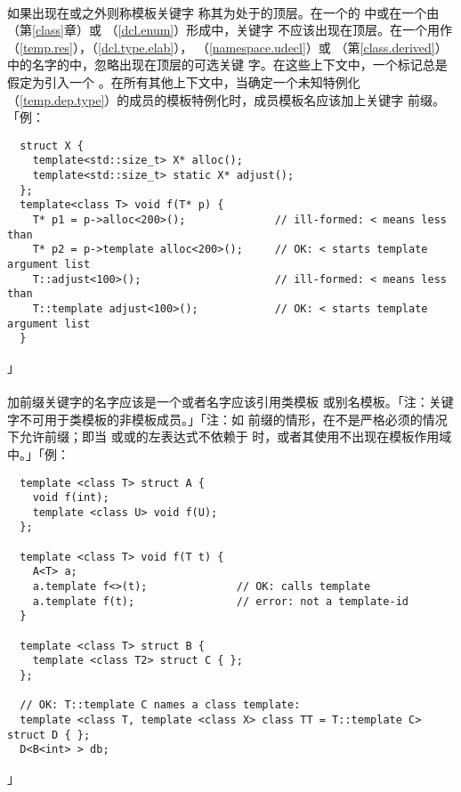 \paragraph{}
如果出现在或之外则称模板关键字
称其为处于的顶层。在一个的
中或在一个由（第\ref{class}章）或
（\ref{dcl.enum}）形成中，关键字
不应该出现在顶层。在一个用作
（\ref{temp.res}），（\ref{dcl.type.elab}），
（\ref{namespace.udecl}）或
（第\ref{class.derived}）中的名字的中，忽略出现在顶层的可选关键
字。在这些上下文中，一个\tm{<}标记总是假定为引入一个
。在所有其他上下文中，当确定一个未知特例化
（\ref{temp.dep.type}）的成员的模板特例化时，成员模板名应该加上关键字
前缀。「例：
\begin{lstlisting}
  struct X {
    template<std::size_t> X* alloc();
    template<std::size_t> static X* adjust();
  };
  template<class T> void f(T* p) {
    T* p1 = p->alloc<200>();              // ill-formed: < means less than
    T* p2 = p->template alloc<200>();     // OK: < starts template argument list
    T::adjust<100>();                     // ill-formed: < means less than
    T::template adjust<100>();            // OK: < starts template argument list
  }
\end{lstlisting}」

\paragraph{}
加前缀关键字的名字应该是一个或者名字应该引用类模板
或别名模板。「注：关键字不可用于类模板的非模板成员。」「注：如
前缀的情形，在不是严格必须的情况下允许前缀；即当
或\tm{->}或的左表达式不依赖于
时，或者其使用不出现在模板作用域中。」「例：
\begin{lstlisting}
  template <class T> struct A {
    void f(int);
    template <class U> void f(U);
  };

  template <class T> void f(T t) {
    A<T> a;
    a.template f<>(t);              // OK: calls template
    a.template f(t);                // error: not a template-id
  }

  template <class T> struct B {
    template <class T2> struct C { };
  };

  // OK: T::template C names a class template:
  template <class T, template <class X> class TT = T::template C> struct D { };
  D<B<int> > db;
\end{lstlisting}」

